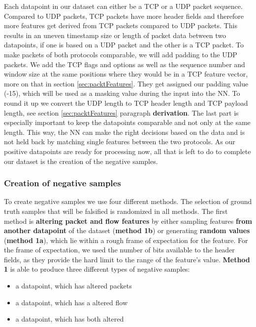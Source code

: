 \documentclass[
	ngerman,
	ruledheaders=section,%
	class=report,%
	thesis={type=bachelor},%
	accentcolor=9c,%
	custommargins=true,%
	marginpar=false,%
	parskip=half-,%
	fontsize=11pt,%
	twoside
]{tudapub}
\begin{document}
Each datapoint in our dataset can either be a TCP or a UDP packet sequence.
Compared to UDP packets, TCP packets have more header fields and therefore more features get derived from TCP packets compared to UDP packets.
This results in an uneven timestamp size or length of packet data between two datapoints, if one is based on a UDP packet and the other is a TCP packet.
To make packets of both protocols comparable, we will add padding to the UDP packets.
We add the TCP flags and options as well as the sequence number and window size at the same positions where they would be in a TCP feature vector, more on that in section \ref{sec:packtFeatures}.
They get assigned our padding value (-15), which will be used as a masking value during the input into the NN.
To round it up we convert the UDP length to TCP header length and TCP payload length, see section \ref{sec:packtFeatures} paragraph \textbf{derivation}.
The last part is especially important to keep the datapoints comparable and not only at the same length.
This way, the NN can make the right decisions based on the data and is not held back by matching single features between the two protocols.
As our positive datapoints are ready for processing now, all that is left to do to complete our dataset is the creation of the negative samples.

\subsubsection{Creation of negative samples}
\label{sec:negativeSamples}

To create negative samples we use four different methods.
The selection of ground truth samples that will be falsified is randomized in all methods.
The first method is \textbf{altering packet and flow features} by either sampling features \textbf{from another datapoint} of the dataset (\textbf{method 1b}) or generating \textbf{random values} (\textbf{method 1a}), which lie within a rough frame of expectation for the feature.
For the frame of expectation, we used the number of bits available to the header fields, as they provide the hard limit to the range of the feature's value.
\textbf{Method 1} is able to produce three different types of negative samples:

\begin{itemize}
    \item a datapoint, which has altered packets
    \item a datapoint, which has a altered flow
    \item a datapoint, which has both altered
\end{itemize}
\end{document}
